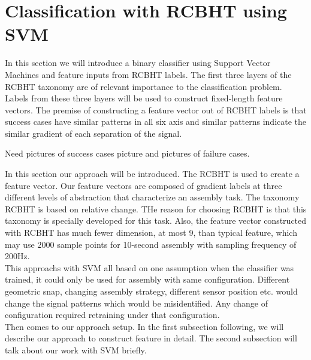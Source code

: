 %

\chapter{Classification with RCBHT using SVM}
In this section we will introduce a binary classifier using Support Vector Machines and feature inputs from RCBHT labels. The first three layers of the RCBHT taxonomy are of relevant importance to the classification problem. Labels from these three layers will be used to construct fixed-length feature vectors. The premise of constructing a feature vector out of RCBHT labels is that success cases have similar patterns in all six axis and similar patterns indicate the similar gradient of each separation of the signal.


\indent Need pictures of success cases picture and pictures of failure cases.



\indent In this section our approach will be introduced. The RCBHT is used to create a feature vector. Our feature vectors are composed of gradient labels at three different levels of abstraction that characterize an assembly task. The taxonomy RCBHT is based on relative change. THe reason for choosing RCBHT is that this taxonomy is specially developed for this task. Also, the feature vector constructed with RCBHT has much fewer dimension, at most 9, than typical feature, which may use 2000 sample points for 10-second assembly with sampling frequency of 200Hz. \\
\indent This approachs with SVM all based on one assumption when the classifier was trained, it could only be used for assembly with same configuration. Different geometric snap, changing assembly strategy, different sensor position etc. would change the signal patterns which would be misidentified. Any change of configuration required retraining under that configuration. \\
\indent Then comes to our approach setup. In the first subsection following, we will describe our approach to construct feature in detail. The second subsection will talk about our work with SVM briefly. 
